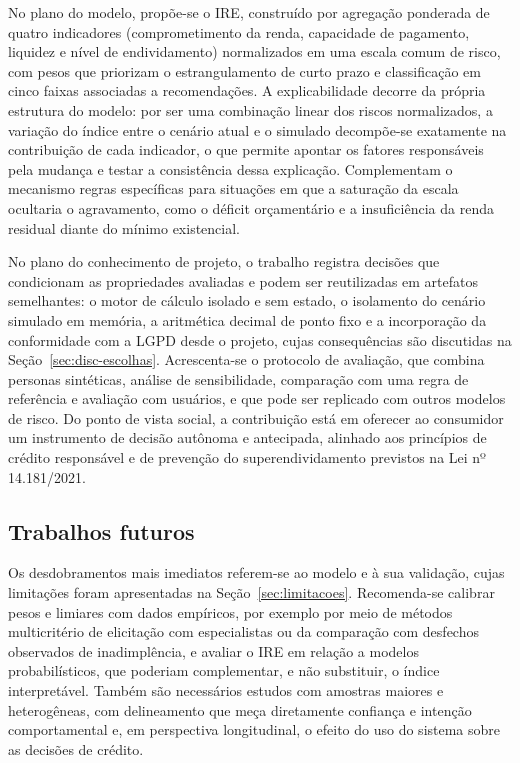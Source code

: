 \documentclass[portuguese]{sbc2025}%
\begin{document}
No plano do modelo, propõe-se o IRE, construído por agregação ponderada de quatro indicadores (comprometimento da renda, capacidade de pagamento, liquidez e nível de endividamento) normalizados em uma escala comum de risco, com pesos que priorizam o estrangulamento de curto prazo e classificação em cinco faixas associadas a recomendações. A explicabilidade decorre da própria estrutura do modelo: por ser uma combinação linear dos riscos normalizados, a variação do índice entre o cenário atual e o simulado decompõe-se exatamente na contribuição de cada indicador, o que permite apontar os fatores responsáveis pela mudança e testar a consistência dessa explicação. Complementam o mecanismo regras específicas para situações em que a saturação da escala ocultaria o agravamento, como o déficit orçamentário e a insuficiência da renda residual diante do mínimo existencial.

No plano do conhecimento de projeto, o trabalho registra decisões que condicionam as propriedades avaliadas e podem ser reutilizadas em artefatos semelhantes: o motor de cálculo isolado e sem estado, o isolamento do cenário simulado em memória, a aritmética decimal de ponto fixo e a incorporação da conformidade com a LGPD desde o projeto, cujas consequências são discutidas na Seção~\ref{sec:disc-escolhas}. Acrescenta-se o protocolo de avaliação, que combina personas sintéticas, análise de sensibilidade, comparação com uma regra de referência e avaliação com usuários, e que pode ser replicado com outros modelos de risco. Do ponto de vista social, a contribuição está em oferecer ao consumidor um instrumento de decisão autônoma e antecipada, alinhado aos princípios de crédito responsável e de prevenção do superendividamento previstos na Lei nº 14.181/2021.

\subsection{Trabalhos futuros}

Os desdobramentos mais imediatos referem-se ao modelo e à sua validação, cujas limitações foram apresentadas na Seção~\ref{sec:limitacoes}. Recomenda-se calibrar pesos e limiares com dados empíricos, por exemplo por meio de métodos multicritério de elicitação com especialistas ou da comparação com desfechos observados de inadimplência, e avaliar o IRE em relação a modelos probabilísticos, que poderiam complementar, e não substituir, o índice interpretável. Também são necessários estudos com amostras maiores e heterogêneas, com delineamento que meça diretamente confiança e intenção comportamental e, em perspectiva longitudinal, o efeito do uso do sistema sobre as decisões de crédito.
\end{document}
